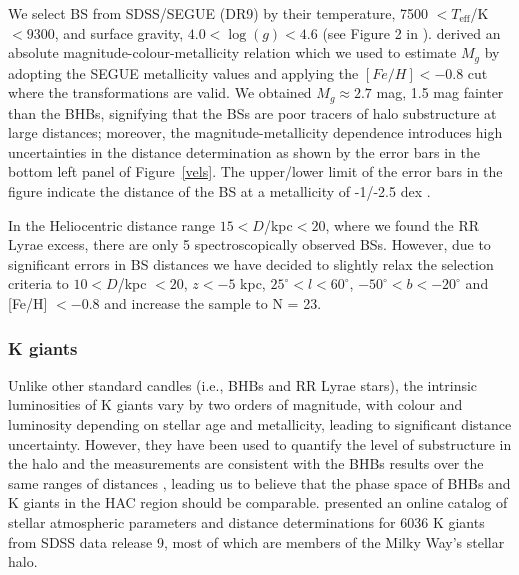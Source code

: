 \documentclass[useAMS,usenatbib]{mn2e}
\begin{document}
We select BS from SDSS/SEGUE (DR9) by their temperature, 7500 $<T_{\mathrm{eff}}$/K $< 9300$, and surface gravity, $4.0 < \log(g) < 4.6$  (see Figure 2 in \citealt{Be13}). \citet{Ki94} derived an absolute magnitude-colour-metallicity relation which we used to 
estimate $M_{g}$ by adopting the SEGUE metallicity values and applying the $[Fe/H] < -0.8$ cut where the transformations are valid. We obtained $M_{g} \approx 2.7$ mag, 1.5 mag fainter than the BHBs, signifying that the BSs are poor tracers of halo substructure at large distances; moreover, the magnitude-metallicity dependence introduces high uncertainties in the distance determination as shown by the error bars in the bottom left panel of Figure~\ref{vels}. The upper/lower limit of the error bars in the figure indicate the distance of the BS at a metallicity of -1/-2.5 dex . 

In the Heliocentric distance range $15<D$/kpc$<20$, where we found the RR Lyrae excess, there are only 5 spectroscopically observed BSs. However, due to significant errors in BS distances we have decided to slightly relax 
the selection criteria to $10<D$/kpc $ <20$, $z<-5$ kpc, $25^{\circ}<l<60^{\circ}$, $-50^{\circ}<b<-20^{\circ}$ and [Fe/H] $< -0.8$ and increase the sample to N = 23. 

\subsubsection{K giants}
Unlike other standard candles (i.e., BHBs and RR Lyrae stars), the intrinsic luminosities of K giants vary by two orders of magnitude, with colour and luminosity depending on stellar age and metallicity, leading to significant distance uncertainty. However, they have been used to quantify the level of substructure in the halo and the measurements are consistent with the BHBs results over the same ranges of distances \citep{Xu14}, leading us to believe that the phase space of BHBs and K giants in the HAC region should be comparable. \citealt{Xu14} presented an online catalog of stellar atmospheric parameters and distance determinations for 6036 K giants from SDSS data release 9, most of which are members of the Milky Way's stellar halo.
\end{document}
